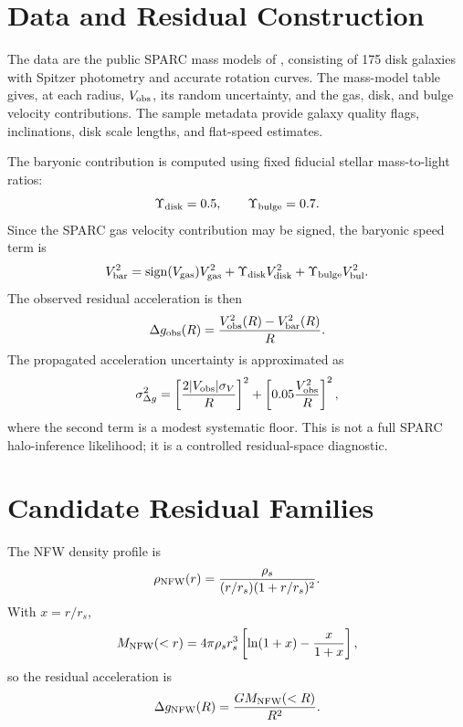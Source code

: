 \documentclass[10pt]{article}
\begin{document}
\section{Data and Residual Construction}

The data are the public SPARC mass models of \citet{Lelli2016}, consisting of
175 disk galaxies with Spitzer photometry and accurate rotation curves. The
mass-model table gives, at each radius, $V_{\rm obs}$, its random uncertainty,
and the gas, disk, and bulge velocity contributions. The sample metadata
provide galaxy quality flags, inclinations, disk scale lengths, and flat-speed
estimates.

The baryonic contribution is computed using fixed fiducial stellar
mass-to-light ratios:
\begin{equation}
\Upsilon_{\rm disk}=0.5,
\qquad
\Upsilon_{\rm bulge}=0.7.
\end{equation}
Since the SPARC gas velocity contribution may be signed, the baryonic speed
term is
\begin{equation}
V_{\rm bar}^2
=
{\rm sign}(V_{\rm gas})V_{\rm gas}^2
+
\Upsilon_{\rm disk}V_{\rm disk}^2
+
\Upsilon_{\rm bulge}V_{\rm bul}^2.
\end{equation}
The observed residual acceleration is then
\begin{equation}
\Delta g_{\rm obs}(R)
=
\frac{V_{\rm obs}^2(R)-V_{\rm bar}^2(R)}{R}.
\end{equation}
The propagated acceleration uncertainty is approximated as
\begin{equation}
\sigma_{\Delta g}^2
=
\left[
\frac{2|V_{\rm obs}|\sigma_V}{R}
\right]^2
+
\left[
0.05\frac{V_{\rm obs}^2}{R}
\right]^2,
\end{equation}
where the second term is a modest systematic floor. This is not a full SPARC
halo-inference likelihood; it is a controlled residual-space diagnostic.

\section{Candidate Residual Families}

The NFW density profile \citep{Navarro1996} is
\begin{equation}
\rho_{\rm NFW}(r)
=
\frac{\rho_s}{(r/r_s)(1+r/r_s)^2}.
\end{equation}
With $x=r/r_s$,
\begin{equation}
M_{\rm NFW}(<r)
=
4\pi\rho_s r_s^3
\left[
\ln(1+x)-\frac{x}{1+x}
\right],
\end{equation}
so the residual acceleration is
\begin{equation}
\Delta g_{\rm NFW}(R)
=
\frac{G M_{\rm NFW}(<R)}{R^2}.
\end{equation}
\end{document}

